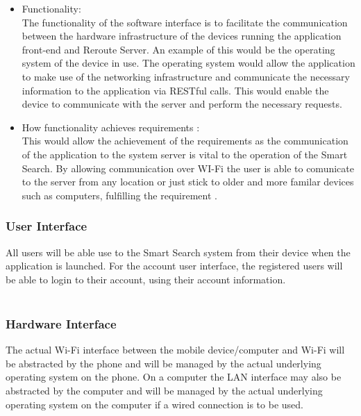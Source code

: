 \documentclass[a4paper,10pt]{article}
\begin{document}
{\begin{enumerate}
\begin{itemize}
					\item Functionality:\\
						The functionality of the software interface is to facilitate the communication between the hardware infrastructure of the devices running the application front-end and Reroute Server. An example of this would be the operating system of the device in use. The operating system would allow the application to make use of the networking infrastructure and communicate the necessary information to the application via RESTful calls. This would enable the device to communicate with the server and perform the necessary requests.
\\
					\item How functionality achieves requirements :\\
This would allow the achievement of the requirements as the communication of the application to the system server is vital to the operation of the Smart Search. By allowing communication over WI-Fi the user is able to comunicate to the server from any location  or just stick to older and more familar devices such as computers, fulfilling the requirement .
					\end{itemize}
			\end{enumerate} 
}

		
            \subsubsection{User Interface}
	    {All users will be able use to the Smart Search system from their device when the application is launched.
For the account user interface, the registered users will be able to login to their account, using their account information.
\\\\
}

\subsubsection{Hardware Interface}
		{
The actual Wi-Fi interface between the mobile device/computer and Wi-Fi will be abstracted by the phone and will be managed by the actual underlying operating system on the phone. On a computer the LAN interface may also be abstracted by the computer and will be managed by the actual underlying operating system on the computer if a wired connection is to be used.}
\end{document}
